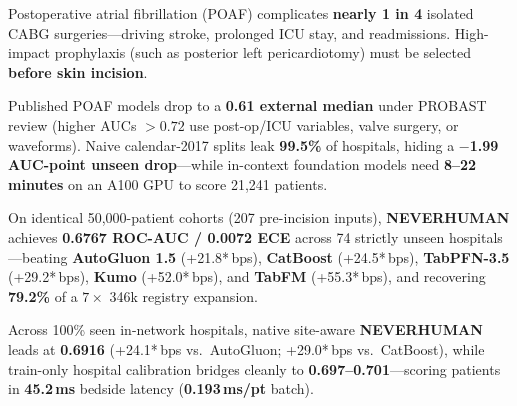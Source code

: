 \documentclass[10pt,letterpaper]{article}
\begin{document}
\noindent
\begin{minipage}[t]{0.486\textwidth}
  \vspace{0pt}
  {\fontsize{7.95}{9.95}\selectfont
  Postoperative atrial fibrillation (POAF) complicates \textbf{nearly 1 in 4} isolated CABG surgeries---driving stroke, prolonged ICU stay, and readmissions. High-impact prophylaxis (such as posterior left pericardiotomy) must be selected \textbf{before skin incision}.

  \vspace{2.5pt}
  Published POAF models drop to a \textbf{0.61 external median} under PROBAST review (higher AUCs $>0.72$ use post-op/ICU variables, valve surgery, or waveforms). Naive calendar-2017 splits leak \textbf{99.5\%} of hospitals, hiding a \textbf{$-$1.99 AUC-point unseen drop}---while in-context foundation models need \textbf{8--22 minutes} on an A100 GPU to score 21,241 patients.
  }
\end{minipage}\hfill
\begin{minipage}[t]{0.486\textwidth}
  \vspace{0pt}
  {\fontsize{7.95}{9.95}\selectfont
  On identical 50,000-patient cohorts (207 pre-incision inputs), \textbf{NEVERHUMAN} achieves \textbf{0.6767 ROC-AUC / 0.0072 ECE} across 74 strictly unseen hospitals---beating \textbf{AutoGluon 1.5} (+21.8*\,bps), \textbf{CatBoost} (+24.5*\,bps), \textbf{TabPFN-3.5} (+29.2*\,bps), \textbf{Kumo} (+52.0*\,bps), and \textbf{TabFM} (+55.3*\,bps), and recovering \textbf{79.2\%} of a $7\times$ 346k registry expansion.

  \vspace{2.5pt}
  Across 100\% seen in-network hospitals, native site-aware \textbf{NEVERHUMAN} leads at \textbf{0.6916} (+24.1*\,bps vs.\ AutoGluon; +29.0*\,bps vs.\ CatBoost), while train-only hospital calibration bridges cleanly to \textbf{0.697--0.701}---scoring patients in \textbf{45.2\,ms} bedside latency (\textbf{0.193\,ms/pt} batch).
  }
\end{minipage}

\vspace{4.5pt}
\end{document}
